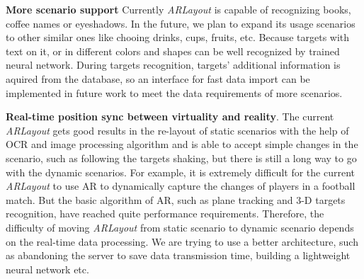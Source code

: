 \textbf{More scenario support}
Currently \textit{ARLayout} is capable of recognizing books, coffee names or eyeshadows.
In the future, we plan to expand its usage scenarios to other similar ones like chooing drinks, cups, fruits, etc.
Because targets with text on it, or in different colors and shapes can be well recognized by trained neural network.
During targets recognition, targets' additional information is aquired from the database,
so an interface for fast data import can be implemented
in future work to meet the data requirements of more scenarios.





\textbf{Real-time position sync between virtuality and reality}. The current \textit{ARLayout} gets good results in the re-layout of static scenarios
with the help of OCR and image processing algorithm
and is able to accept simple changes in the scenario,
such as following the targets shaking,
but there is still a long way to go with the dynamic scenarios.
For example, it is extremely difficult for the current \textit{ARLayout} to use AR
to dynamically capture the changes of players in a football match.
But the basic algorithm of AR,
such as plane tracking and 3-D targets recognition,
have reached quite performance requirements.
Therefore, the difficulty of moving \textit{ARLayout} from static scenario to dynamic scenario
depends on the real-time data processing.
We are trying to use a better architecture,
such as abandoning the server to save data transmission time,
building a lightweight neural network etc.

